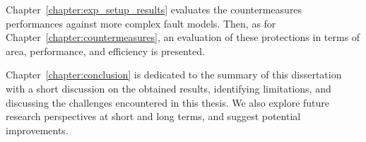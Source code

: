 Chapter~\ref{chapter:exp_setup_results} evaluates the countermeasures performances against more complex fault models. Then, as for Chapter~\ref{chapter:countermeasures}, an evaluation of these protections in terms of area, performance, and efficiency is presented.

Chapter~\ref{chapter:conclusion} is dedicated to the summary of this dissertation with a short discussion on the obtained results, identifying limitations, and discussing the challenges encountered in this thesis.
We also explore future research perspectives at short and long terms, and suggest potential improvements.

